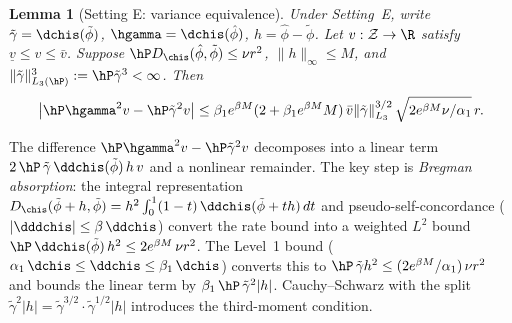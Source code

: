 \documentclass{article}
\newtheorem{lemma}[theorem]{Lemma}
\begin{document}
\begin{lemma}[Setting E: variance equivalence]\label{lem:variance-equiv}
Under Setting~E,
write $\tilde\gamma = \dchis(\tilde\phi)$,
$\hgamma = \dchis(\hat\phi)$,
$h = \hat\phi - \tilde\phi$.
Let $v: \mathcal{Z} \to \R$ satisfy $\underline{v} \le v \le \bar{v}$.
Suppose $\hP D_{\chis}(\hat\phi, \tilde\phi) \le \nu r^2$,
$\|h\|_\infty \le M$,
and $\|\tilde\gamma\|_{L_3(\hP)}^3 := \hP \tilde\gamma^3 < \infty$.
Then
\begin{equation}\label{eq:variance-equiv-bound}
\abs{\hP \hgamma^2 v - \hP \tilde\gamma^2 v} \le \beta_1 e^{\beta M}(2 + \beta_1 e^{\beta M} M)\, \bar{v} \|\tilde\gamma\|_{L_3}^{3/2}\, \sqrt{2 e^{\beta M}\nu/\alpha_1}\, r.
\end{equation}
\end{lemma}

The difference $\hP \hgamma^2 v - \hP \tilde\gamma^2 v$ decomposes into a linear term $2\,\hP\, \tilde\gamma\, \ddchis(\tilde\phi)\, h\, v$ and a nonlinear remainder. The key step is \emph{Bregman absorption}: the integral representation $D_{\chis}(\tilde\phi+h,\tilde\phi) = h^2 \int_0^1 (1-t)\,\ddchis(\tilde\phi+th)\,dt$ and pseudo-self-concordance ($|\dddchis| \le \beta\,\ddchis$) convert the rate bound into a weighted $L^2$ bound $\hP\, \ddchis(\tilde\phi)\, h^2 \le 2e^{\beta M}\, \nu r^2$. The Level~1 bound ($\alpha_1\, \dchis \le \ddchis \le \beta_1\, \dchis$) converts this to $\hP\, \tilde\gamma h^2 \le (2 e^{\beta M}/\alpha_1)\,\nu r^2$ and bounds the linear term by $\beta_1\,\hP\,\tilde\gamma^2|h|$. Cauchy--Schwarz with the split $\tilde\gamma^2|h| = \tilde\gamma^{3/2} \cdot \tilde\gamma^{1/2}|h|$ introduces the third-moment condition.
\end{document}
